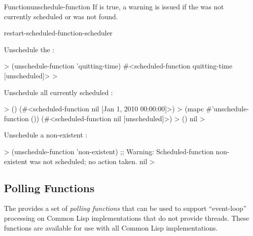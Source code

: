 \documentclass[10pt,twoside,english,pdftex]{article}
\begin{document}
\begin{functiondoc}{Function}{unschedule-function}
If  is true, a warning is issued if the 
was not currently scheduled or was not found.

\begin{alsos}{restart-scheduled-function-scheduler}
\end{alsos}

\fnexamples
Unschedule the  :
%
\W\supp
\begin{example}
  > (unschedule-function 'quitting-time)
  #<scheduled-function quitting-time [unscheduled]>
  >
\end{example}
%
%
%
Unschedule all currently scheduled :
%
\W\supp\notpretop
\begin{example}
  > ()
  (#<scheduled-function nil [Jan 1, 2010 00:00:00]>)
  > (mapc #'unschedule-function ())
  (#<scheduled-function nil [unscheduled]>)
  > ()
  nil
  >
\end{example}
%
Unschedule a non-existent :
%
\W\supp\notpretop
\begin{example}
  > (unschedule-function 'non-existent)
  ;; Warning: Scheduled-function non-existent was not scheduled; no action taken.
  nil
  >
\end{example}

\end{functiondoc}


\T\markright{}%
\T\pagestyle{plain}
\T\clearpage
\W{}
\T\pagestyle{fancy}
\T\thispagestyle{fancybottom}
\T\global\def\fnlastname{ }%

\subsection{Polling Functions}
\label{sec:pollingfunctions}%

%
%
%
The   provides a set of \textit{polling
  functions\/} that can be used to support ``event-loop'' processing on Common
Lisp implementations that do not provide threads.  These functions are
available for use with all Common Lisp implementations.
\end{document}
